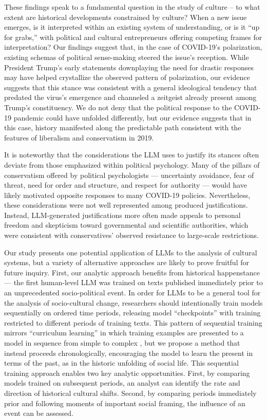 \documentclass{article} %
\begin{document}
These findings speak to a fundamental question in the study of culture
-- to what extent are historical developments constrained by culture?
When a new issue emerges, is it interpreted within an existing system of
understanding, or is it ``up for grabs,'' with political and cultural
entrepreneurs offering competing frames for interpretation? Our findings
suggest that, in the case of COVID-19's polarization, existing schemas
of political sense-making steered the issue's reception. While President
Trump's early statements downplaying the need for drastic responses may
have helped crystallize the observed pattern of polarization, our
evidence suggests that this stance was consistent with a general
ideological tendency that predated the virus's emergence and channeled a
zeitgeist already present among Trump's constituency. We do not deny
that the political response to the COVID-19 pandemic could have unfolded
differently, but our evidence suggests that in this case, history
manifested along the predictable path consistent with the features of
liberalism and conservatism in 2019.

It is noteworthy that the considerations the LLM uses to justify its
stances often deviate from those emphasized within political psychology.
Many of the pillars of conservatism offered by political psychologists
--- uncertainty avoidance, fear of threat, need for order and structure,
and respect for authority
\parencite{Jost2006-wm} --- would have
likely motivated opposite responses to many COVID-19 policies.
Nevertheless, these considerations were not well represented among
produced justifications. Instead, LLM-generated justifications more
often made appeals to personal freedom and skepticism toward
governmental and scientific authorities, which were consistent with
conservatives' observed resistance to large-scale restrictions.

Our study presents one potential application of LLMs to the analysis of
cultural systems, but a variety of alternative approaches are likely to
prove fruitful for future inquiry. First, our analytic approach benefits
from historical happenstance --- the first human-level LLM was trained
on texts published immediately prior to an unprecedented socio-political
event. In order for LLMs to be a general tool for the analysis of
socio-cultural change, researchers should intentionally train models
sequentially on ordered time periods, releasing model ``checkpoints''
with training restricted to different periods of training texts. This
pattern of sequential training mirrors ``curriculum learning'' in which
training examples are presented to a model in sequence from simple to
complex \parencite{Bengio2009-ig}, but we propose a method that instead proceeds chronologically,
encouraging the model to learn the present in terms of the past, as in
the historic unfolding of social life. This sequential training approach
enables two key analytic opportunities. First, by comparing models
trained on subsequent periods, an analyst can identify the rate and
direction of historical cultural shifts. Second, by comparing periods
immediately prior and following moments of important social framing, the
influence of an event can be assessed.
\end{document}
